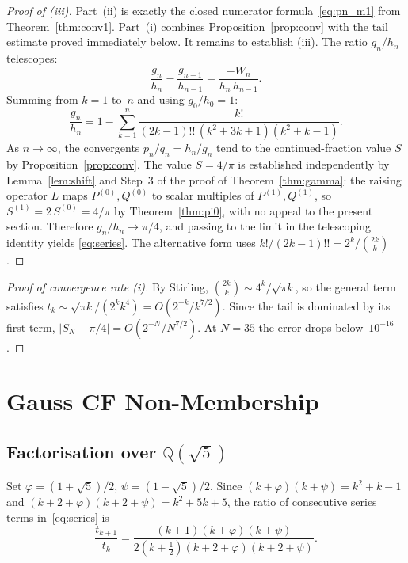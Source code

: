 \documentclass[11pt,a4paper]{article}
\theoremstyle{plain}
\theoremstyle{definition}
\theoremstyle{remark}
\newcommand{\half}{\tfrac{1}{2}}
\newcommand{\dff}[1]{(#1)!!}
\begin{document}
\begin{proof}[Proof of \textup{(iii)}]
Part~\textup{(ii)} is exactly the closed numerator formula~\eqref{eq:pn_m1}
from Theorem~\ref{thm:conv1}. Part~\textup{(i)} combines
Proposition~\ref{prop:conv} with the tail estimate proved immediately below.
It remains to establish \textup{(iii)}. The ratio $g_n/h_n$ telescopes:
\[
  \frac{g_n}{h_n} - \frac{g_{n-1}}{h_{n-1}}
  = \frac{-W_n}{h_n\,h_{n-1}}.
\]
Summing from $k = 1$ to~$n$ and using $g_0/h_0 = 1$:
\[
  \frac{g_n}{h_n}
  = 1 - \sum_{k=1}^{n}
    \frac{k!}{\dff{2k{-}1}\,(k^2{+}3k{+}1)(k^2{+}k{-}1)}.
\]
As $n\to\infty$, the convergents $p_n/q_n = h_n/g_n$ tend to the
continued-fraction value $S$ by Proposition~\ref{prop:conv}.
The value $S = 4/\pi$ is established independently by
Lemma~\ref{lem:shift} and Step~3 of the proof of
Theorem~\ref{thm:gamma}: the raising operator $L$ maps
$P^{(0)},Q^{(0)}$ to scalar multiples of $P^{(1)},Q^{(1)}$, so
$S^{(1)} = 2\,S^{(0)} = 4/\pi$ by Theorem~\ref{thm:pi0}, with no
appeal to the present section. Therefore $g_n/h_n \to \pi/4$, and
passing to the limit in the telescoping identity yields
\eqref{eq:series}. The alternative form uses
$k!/\dff{2k{-}1} = 2^k/\binom{2k}{k}$
\citep[see][\S1.2.6]{knuth1997}.
\end{proof}

\begin{proof}[Proof of convergence rate \textup{(i)}]
By Stirling, $\binom{2k}{k} \sim 4^k/\sqrt{\pi k}$, so the
general term satisfies
$t_k \sim \sqrt{\pi k}/(2^k k^4) = O(2^{-k}/k^{7/2})$.
Since the tail is dominated by its first term,
$|S_N - \pi/4| = O(2^{-N}/N^{7/2})$.
At $N = 35$ the error drops below~$10^{-16}$.
\end{proof}

\section{Gauss CF Non-Membership}\label{sec:gauss}

\subsection{Factorisation over \texorpdfstring{$\mathbb{Q}(\sqrt{5})$}{Q(sqrt5)}}

Set $\varphi = (1{+}\sqrt{5})/2$, $\psi = (1{-}\sqrt{5})/2$.
Since $(k{+}\varphi)(k{+}\psi) = k^2{+}k{-}1$
and $(k{+}2{+}\varphi)(k{+}2{+}\psi) = k^2{+}5k{+}5$,
the ratio of consecutive series terms in~\eqref{eq:series} is
\begin{equation}\label{eq:ratio_hyp}
  \frac{t_{k+1}}{t_k}
  = \frac{(k{+}1)(k{+}\varphi)(k{+}\psi)}
         {2(k{+}\half)(k{+}2{+}\varphi)(k{+}2{+}\psi)}.
\end{equation}
\end{document}
